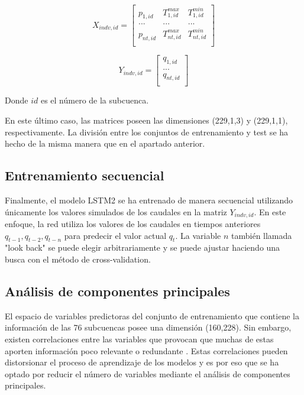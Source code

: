 \begin{equation*}
    X_{indv,id}= 
    \begin{bmatrix}
        p_{1,id} & T^{max}_{1,id} &  T^{min}_{1,id} \\
        ... & ... &  ... \\
        p_{nt,id} & T^{max}_{nt,id} &  T^{min}_{nt,id} \\
        \end{bmatrix}
\end{equation*}

\vspace{5mm}


\begin{equation*}
    Y_{indv,id}= 
    \begin{bmatrix}
        q_{1,id}  \\
        ...  \\
        q_{nt,id}  \\
        \end{bmatrix}
\end{equation*}

\vspace{5mm}

Donde $id$ es el número de la subcuenca. 
\vspace{5mm}

En este último caso, las matrices poseen las dimensiones (229,1,3) y (229,1,1), respectivamente. 
La división entre los conjuntos de entrenamiento y test se ha hecho de la misma manera que en el apartado anterior.

\subsection{Entrenamiento secuencial}

Finalmente, el modelo LSTM2 se ha entrenado de manera secuencial utilizando únicamente los valores simulados de los caudales en la matriz $Y_{indv,id}$.
En este enfoque, la red utiliza los valores de los caudales en tiempos anteriores
 $q_{t-1}, q_{t-2}, q_{t-n}$ para predecir el valor actual $q_{t}$. 
 La variable $n$ también llamada "look back" se puede elegir arbitrariamente y se puede ajustar haciendo 
 una busca con el método de cross-validation.


\subsection{Análisis de componentes principales}

El espacio de variables predictoras del conjunto de entrenamiento 
que contiene la información de las 76 subcuencas posee una dimensión (160,228).
Sin embargo, existen correlaciones entre las variables que 
provocan que muchas de estas aporten información poco relevante o redundante \cite{Manu}. 
Estas correlaciones pueden distorsionar el proceso de aprendizaje de los modelos \cite{gutierrez} 
y es por eso que se ha optado por reducir el número de variables mediante el análisis de componentes principales\cite{PCA}.

